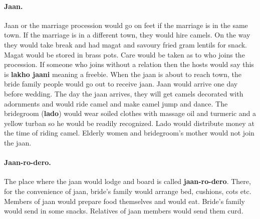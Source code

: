 \paragraph{Jaan.} Jaan or the marriage procession would go on feet if the
marriage is in the same town. If the marriage is in a different town, they
would hire camels. On the way they would take break and had magat and savoury
fried gram lentils for snack. Magat would be stored in brass pots. Care would
be taken as to who joins the procession. If someone who joins without a
relation then the hosts would say this is \textbf{lakho jaani} meaning a
freebie. When the jaan is about to reach town, the bride family people would go
out to receive jaan. Jaan would arrive one day before wedding. The day the jaan
arrives, they will get camels decorated with adornments and would ride camel
and make camel jump and dance. The bridegroom (\textbf{lado}) would wear soiled
clothes with massage oil and turmeric and a yellow turban so he would be
readily recognized. Lado would distribute money at the time of riding camel.
Elderly women and bridegroom's mother would not join the jaan.

\paragraph{Jaan-ro-dero.} The place where the jaan would lodge and board is
called \textbf{jaan-ro-dero}. There, for the convenience of jaan, bride's family
would arrange bed, cushions, cots etc. Members of jaan would prepare food
themselves and would eat. Bride's family would send in some snacks. Relatives
of jaan members would send them curd.

